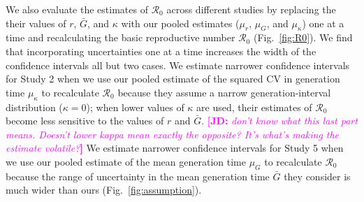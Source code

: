 \documentclass[12pt]{article}
\newcommand{\eref}[1]{(\ref{eq:#1})}
\newcommand{\fref}[1]{Fig.~\ref{fig:#1}}
\newcommand{\comment}[3]{\textcolor{#1}{\textbf{[#2: }\textsl{#3}\textbf{]}}}
\newcommand{\jd}[1]{\comment{magenta}{JD}{#1}}
\begin{document}
We also evaluate the estimates of $\mathcal R_0$ across different studies by 
replacing the their values of $r$, $\bar G$, and $\kappa$ with our pooled estimates ($\mu_r$, $\mu_G$, and $\mu_\kappa$) one at a time and recalculating the basic reproductive number $\mathcal R_0$ (\fref{R0}).
We find that incorporating uncertainties one at a time increases the width of the confidence intervals all but two cases.
We estimate narrower confidence intervals for Study 2 when we use our pooled estimate of the squared CV in generation time $\mu_\kappa$ to recalculate $\mathcal R_0$ because they assume a narrow generation-interval distribution ($\kappa=0$);
when lower values of $\kappa$ are used, their estimates of $\mathcal R_0$ become less sensitive to the values of $r$ and $\bar G$. \jd{don't know what this last part means. Doesn't lower kappa mean exactly the opposite? It's what's making the estimate volatile?}
We estimate narrower confidence intervals for Study 5 when we use our pooled estimate of the mean generation time $\mu_G$ to recalculate $\mathcal R_0$ because the range of uncertainty in the mean generation time $\bar G$ they consider is much wider than ours (\fref{assumption}).

\end{document}
